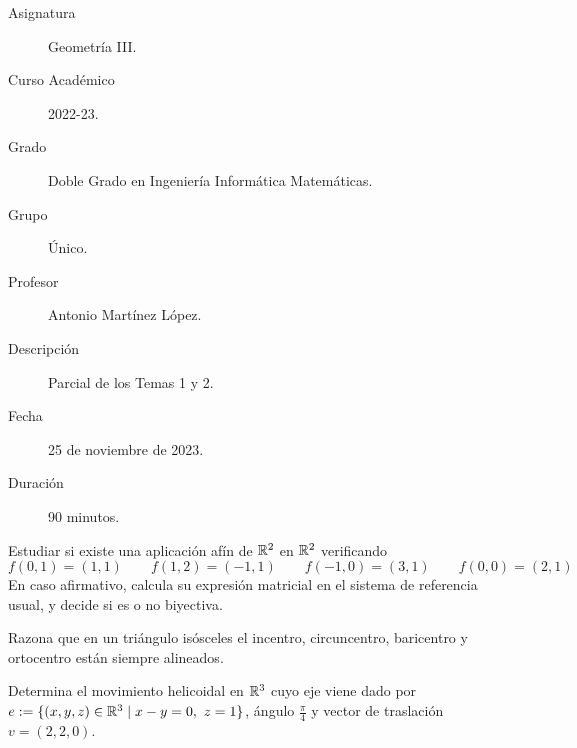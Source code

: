 \documentclass[12pt]{article}
\begin{document}

    
    

    \begin{description}
        \item[Asignatura] Geometría III.
        \item[Curso Académico] 2022-23.
        \item[Grado] Doble Grado en Ingeniería Informática Matemáticas.
        \item[Grupo] Único.
        \item[Profesor] Antonio Martínez López.
        \item[Descripción] Parcial de los Temas 1 y 2.
        \item[Fecha] 25 de noviembre de 2023.
        \item[Duración] 90 minutos.
    
    \end{description}
    \newpage
    
    \begin{ejercicio}[4 puntos]
        Estudiar si existe una aplicación afín de $\mathbb{R}^2$ en $\mathbb{R}^2$ verificando
        \begin{equation*}
            f(0,1)=(1,1) \qquad f(1,2)=(-1,1) \qquad f(-1,0)=(3,1) \qquad f(0,0)=(2,1)
        \end{equation*}
        En caso afirmativo, calcula su expresión matricial en el sistema de referencia usual, y decide si es o no biyectiva.
    \end{ejercicio}

    \begin{ejercicio}[2 puntos]
        Razona que en un triángulo isósceles el incentro, circuncentro, baricentro y ortocentro están siempre alineados.
    \end{ejercicio}

    \begin{ejercicio}[4 puntos]
        Determina el movimiento helicoidal en $\mathbb{R}^3$ cuyo eje viene dado por $e:=\{(x,y,z)\in \mathbb{R}^3\mid x-y=0,~z=1\}$, ángulo $\frac{\pi}{4}$ y vector de traslación $v=(2,2,0)$.
    \end{ejercicio}
\end{document}
